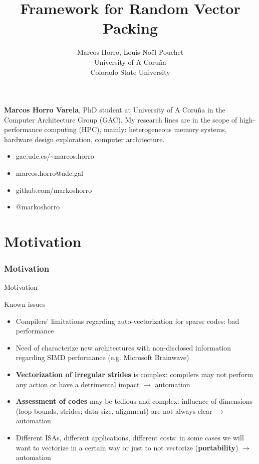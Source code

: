 \documentclass[xcolor=table,hideothersubsections,aspectratio=1610]{beamer}
\title[CSU Internship]{\color{white}\textbf{Framework for Random Vector Packing}}
\subtitle{\color{white}}
\author[Marcos Horro]{
	Marcos Horro, Louis-Noël Pouchet\\
	University of A Coruña\\
	Colorado State University
} %
\date{}
\begin{document}
\begin{frame}[plain,t]
\titlepage
\end{frame}

\begin{frame}[plain]
\tableofcontents[hideallsubsections]
\end{frame}

\begin{frame}[plain]
\textbf{Marcos Horro Varela}, PhD student at University of A Coruña in the Computer Architecture Group (GAC). My research lines are in the scope of high-performance computing (HPC), mainly: heterogeneous memory systems, hardware design exploration, computer architecture.

 \begin{itemize}
     \item gac.udc.es/\~{}marcos.horro
     \item marcos.horro@udc.gal
     \item github.com/markoshorro
     \item @markoshorro
 \end{itemize}
\end{frame}

\section{Motivation}
\frametitle{Motivation}
\begin{frame}{Motivation}
\begin{block}{Known issues}
\begin{itemize}
    \item Compilers' limitations regarding auto-vectorization for sparse codes: bad performance
    \item Need of characterize new architectures with non-disclosed information regarding SIMD performance (e.g. Microsoft Brainwave)
\end{itemize}

\end{block}
\begin{itemize}
    \item \textbf{Vectorization of irregular strides} is complex: compilers may not perform any action or have a detrimental impact $\rightarrow$ automation

        \item \textbf{Assessment of codes} may be tedious and complex: influence of dimensions (loop bounds, strides; data size, alignment) are not always clear $\rightarrow$ automation
        \item Different ISAs, different applications, different costs: in some cases we will want to vectorize in a certain way or just to not vectorize (\textbf{portability}) $\rightarrow$ automation
\end{itemize}
\end{frame}
\end{document}
